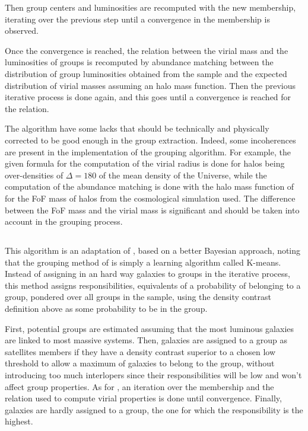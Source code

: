 Then group centers and luminosities are recomputed with the new membership,
iterating over the previous step until a convergence in the membership is
observed.

Once the convergence is reached, the relation between the virial mass and the
luminosities of groups is recomputed by abundance matching between the
distribution of group luminosities obtained from the sample and the expected
distribution of virial masses assuming an halo mass function. Then the previous
iterative process is done again, and this goes until a convergence is reached
for the relation.

The algorithm have some lacks that should be technically and physically
corrected to be good enough in the group extraction. Indeed, some incoherences
are present in the implementation of the grouping algorithm. For example, the
given formula for the computation of the virial radius is done for halos being
over-densities of $\Delta=180$ of the mean density of the Universe, while the
computation of the abundance matching is done with the halo mass function of
\citet{Warren+06} for the FoF mass of halos from the cosmological simulation
used. The difference between the FoF mass and the virial mass is significant
and should be taken into account in the grouping process.

\subsection{\citet{DominguezRomero+12}}
\label{sub:dominguezromero12}

This algorithm is an adaptation of \citet{Yang+07}, based on a better Bayesian
approach, noting that the grouping method of \citet{Yang+07} is simply a
learning algorithm called K-means. Instead of assigning in an hard way galaxies
to groups in the iterative process, this method assigns responsibilities,
equivalents of a probability of belonging to a group, pondered over all groups
in the sample, using the density contrast definition above as some probability
to be in the group.

First, potential groups are estimated assuming that the most luminous galaxies
are linked to most massive systems. Then, galaxies are assigned to a group as
satellites members if they have a density contrast superior to a chosen low
threshold to allow a maximum of galaxies to belong to the group, without
introducing too much interlopers since their responsibilities will be low and
won't affect group properties. As for \citet{Yang+07}, an iteration over the
membership and the relation used to compute virial properties is done until
convergence. Finally, galaxies are hardly assigned to a group, the one for
which the responsibility is the highest.

